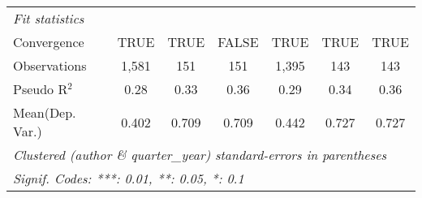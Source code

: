 \begin{tabular}{lcccccc}
   \midrule
   \emph{Fit statistics}\\
   Convergence                  &TRUE           & TRUE    & FALSE   & TRUE          & TRUE       & TRUE\\  
   Observations                 & 1,581         & 151     & 151     & 1,395         & 143        & 143\\  
   Pseudo R$^2$                 & 0.28          & 0.33    & 0.36    & 0.29          & 0.34       & 0.36\\  
Mean(Dep. Var.) & 0.402 & 0.709 & 0.709 & 0.442 & 0.727 & 0.727 \\
   \midrule \midrule
   \multicolumn{7}{l}{\emph{Clustered (author \& quarter\_year) standard-errors in parentheses}}\\
   \multicolumn{7}{l}{\emph{Signif. Codes: ***: 0.01, **: 0.05, *: 0.1}}\\
\end{tabular}
\par\endgroup
